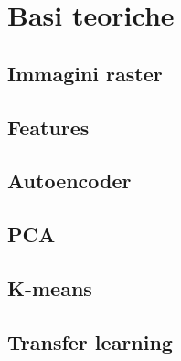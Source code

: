 \chapter{Basi teoriche}
\label{cap:teoria}

\section{Immagini raster}

\section{Features}

\section{Autoencoder}

\section{PCA}

\section{K-means}

\section{Transfer learning}